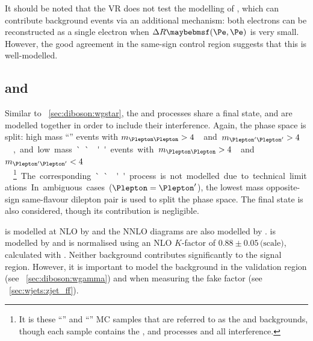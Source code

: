 It should be noted that the \Wgstar VR does not test the modelling of 
\HepProcess{\Wgstar \HepTo \Plepton\Pnu\Pe\Pe}, which can contribute background events via 
an additional mechanism: both electrons can be reconstructed as a single electron when 
$\Delta R\parenths{\Pe,\Pe}$ is very small. However, the good agreement in the same-sign 
control region suggests that this is well-modelled.



\subsection{\ZZ and \Zgstar}
\label{sec:diboson:zz}

Similar to \Section~\ref{sec:diboson:wgstar}, the \ZZ and \Zgstar processes share a 
 final state, and are modelled together in 
order to include their interference. Again, the phase space is split: high mass 
``\ZZ'' events with \unit{$m_{\HepProcess{\Plepton\Plepton}} > 4$}{\GeV} and 
\unit{$m_{\HepProcess{\Plepton'\Plepton'}} > 4$}{\GeV}, and low mass ``\Zgstar'' events 
with \unit{$m_{\HepProcess{\Plepton\Plepton}} > 4$}{\GeV} and 
\unit{$m_{\HepProcess{\Plepton'\Plepton'}} < 4$}{\GeV}.\footnote{
	It is these ``\ZZ'' and ``\Zgstar''	MC samples that are referred to as the \ZZ and 
	\Zgstar backgrounds, though each sample contains the \ZZ, \Zgstar and 
	\HepProcess{\Pgammastar\Pgammastar} processes and all interference.
}
The corresponding ``\HepProcess{\Pgammastar\Pgammastar}'' process is not modelled due to 
technical limitations. In ambiguous cases ($\Plepton = \Plepton'$), the lowest mass 
opposite-sign same-flavour dilepton pair is used to split the phase space. The 
 final state is also considered, though its 
contribution is negligible. 

\ZZ is modelled at NLO by  and the NNLO \ggZZ diagrams are also 
modelled by \meps{\ggtozz}{\fherwig}. \Zgstar is modelled by \sherpa and is normalised using 
an NLO $K$-factor of $0.88\pm0.05\,\text{(scale)}$, calculated with \mcfm. Neither 
background contributes significantly to the signal region. However, it is important to model 
the \Zgstar background in the \Zgamma validation region (see 
\Section~\ref{sec:diboson:wgamma}) and when measuring the \Zjets fake factor (see 
\Section~\ref{sec:wjets:zjet_ff}).

